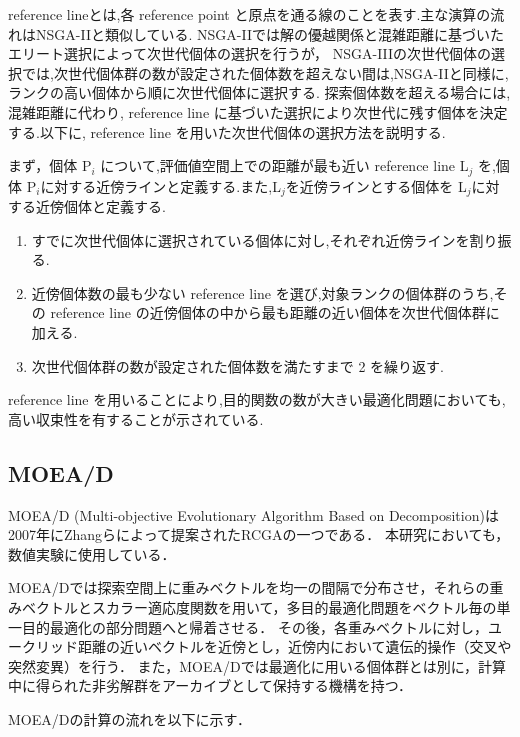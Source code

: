 \documentclass[11pt,a4j,notitlepage]{jreport}
\begin{document}
reference lineとは,各 reference point と原点を通る線のことを表す.主な演算の流れはNSGA-IIと類似している.
NSGA-IIでは解の優越関係と混雑距離に基づいたエリート選択によって次世代個体の選択を行うが，
NSGA-IIIの次世代個体の選択では,次世代個体群の数が設定された個体数を超えない間は,NSGA-IIと同様に,ランクの高い個体から順に次世代個体に選択する.
探索個体数を超える場合には,混雑距離に代わり, reference line に基づいた選択により次世代に残す個体を決定する.以下に, reference line を用いた次世代個体の選択方法を説明する.

まず，個体 P$_i$ について,評価値空間上での距離が最も近い reference line L$_j$ を,個体 P$_i$に対する近傍ラインと定義する.また,L$_j$を近傍ラインとする個体を L$_j$に対する近傍個体と定義する.

\begin{enumerate}
\item すでに次世代個体に選択されている個体に対し,それぞれ近傍ラインを割り振る.
\item 近傍個体数の最も少ない reference line を選び,対象ランクの個体群のうち,その reference line の近傍個体の中から最も距離の近い個体を次世代個体群に加える.
\item 次世代個体群の数が設定された個体数を満たすまで 2 を繰り返す.
\end{enumerate}

reference line を用いることにより,目的関数の数が大きい最適化問題においても,高い収束性を有することが示されている.\cite{Jain}

\subsection{MOEA/D}
\quad MOEA/D (Multi-objective Evolutionary Algorithm Based on Decomposition)\cite{Zhang2007MOEAD}は2007年にZhangらによって提案されたRCGAの一つである．
本研究においても，数値実験に使用している．

MOEA/Dでは探索空間上に重みベクトルを均一の間隔で分布させ，それらの重みベクトルとスカラー適応度関数を用いて，多目的最適化問題をベクトル毎の単一目的最適化の部分問題へと帰着させる．
その後，各重みベクトルに対し，ユークリッド距離の近いベクトルを近傍とし，近傍内において遺伝的操作（交叉や突然変異）を行う．
また，MOEA/Dでは最適化に用いる個体群とは別に，計算中に得られた非劣解群をアーカイブとして保持する機構を持つ．

MOEA/Dの計算の流れを以下に示す．
\end{document}
